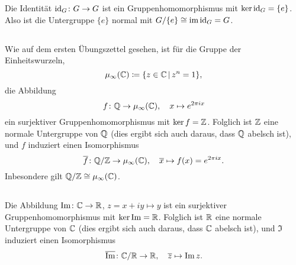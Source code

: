 \section{}





\subsection{}

Die Identität $\operatorname{id}_G \colon G \to G$ ist ein Gruppenhomomorphismus mit $\ker \operatorname{id}_G = \{e\}$.
Also ist die Untergruppe $\{e\}$ normal mit $G/\{e\} \cong \operatorname{im} \operatorname{id}_G = G$.





\subsection{}

Wie auf dem ersten Übungszettel gesehen, ist für die Gruppe der Einheitswurzeln,
\[
            \mu_\infty(\Complex)
  \coloneqq \{ z \in \Complex \suchthat z^n = 1 \},
\]
die Abbildung
\[
          f
  \colon  \mathbb{Q}
  \to     \mu_\infty(\mathbb{C}),
  \quad   x
  \mapsto e^{2 \pi i x}
\]
ein surjektiver Gruppenhomomorphismus mit $\ker f = \mathbb{Z}$.
Folglich ist $\mathbb{Z}$ eine normale Untergruppe von $\mathbb{Q}$ (dies ergibt sich auch daraus, dass $\mathbb{Q}$ abelsch ist), und $f$ induziert einen Isomorphismus
\[
          \overline{f}
  \colon  \mathbb{Q}/\mathbb{Z}
  \to     \mu_\infty(\mathbb{C}),
  \quad   \overline{x}
  \mapsto f(x)
  =       e^{2 \pi i x}.
\]
Inbesondere gilt $\mathbb{Q}/\mathbb{Z} \cong \mu_\infty(\mathbb{C})$.





\subsection{}

Die Abbildung $\operatorname{Im} \colon \mathbb{C} \to \mathbb{R}$, $z = x + iy \mapsto y$ ist ein surjektiver Gruppenhomomorphismus mit $\ker \operatorname{Im} = \mathbb{R}$.
Folglich ist $\mathbb{R}$ eine normale Untergruppe von $\mathbb{C}$ (dies ergibt sich auch daraus, dass $\mathbb{C}$ abelsch ist), und $\Im$ induziert einen Isomorphismus
\[
          \overline{\operatorname{Im}}
  \colon  \mathbb{C}/\mathbb{R}
  \to     \mathbb{R},
  \quad   \overline{z}
  \mapsto \operatorname{Im} z.
\]





